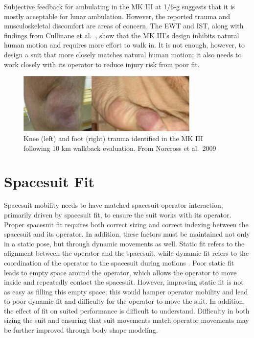 \documentclass[defaultstyle,11pt]{comps}
\begin{document}
Subjective feedback for ambulating in the MK III at 1/6-g suggests that it is mostly acceptable for lunar ambulation.
However, the reported trauma and musculoskeletal discomfort are areas of concern.
The EWT and IST, along with findings from Cullinane et al.~\citep{Cullinane2017a}, show that the MK III's design inhibits natural human motion and requires more effort to walk in.
It is not enough, however, to design a suit that more closely matches natural human motion; it also needs to work closely with its operator to reduce injury risk from poor fit.

\begin{figure}
\hypertarget{fig:B-Trauma}{%
\centering
\includegraphics[width=0.8\textwidth,height=\textheight]{../fig/Background/Trauma.png}
\caption{Knee (left) and foot (right) trauma identified in the MK III following 10 km walkback evaluation. From Norcross et al.~2009}\label{fig:B-Trauma}
}
\end{figure}

\hypertarget{spacesuit-fit}{%
\section{Spacesuit Fit}\label{spacesuit-fit}}

Spacesuit mobility needs to have matched spacesuit-operator interaction, primarily driven by spacesuit fit, to ensure the suit works with its operator.
Proper spacesuit fit requires both correct sizing and correct indexing between the spacesuit and its operator.
In addition, these factors must be maintained not only in a static pose, but through dynamic movements as well.
Static fit refers to the alignment between the operator and the spacesuit, while dynamic fit refers to the coordination of the operator to the spacesuit during motions \citep{Stirling2020}.
Poor static fit leads to empty space around the operator, which allows the operator to move inside and repeatedly contact the spacesuit.
However, improving static fit is not as easy as filling this empty space; this would hamper operator mobility and lead to poor dynamic fit and difficulty for the operator to move the suit.
In addition, the effect of fit on suited performance is difficult to understand.
Difficulty in both sizing the suit and ensuring that suit movements match operator movements may be further improved through body shape modeling.
\end{document}
